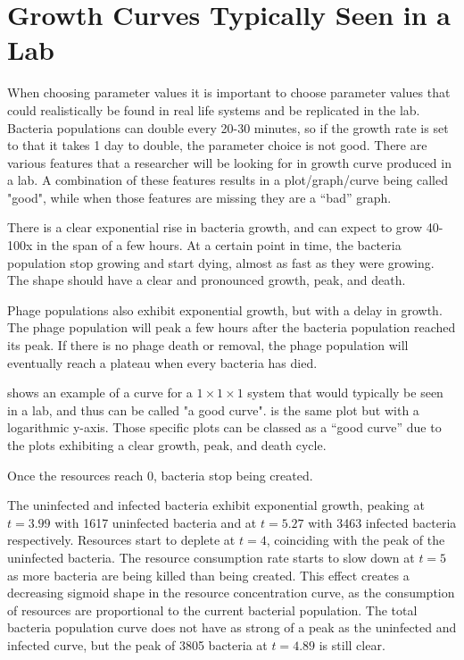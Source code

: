 \section{Growth Curves Typically Seen in a Lab}
\label{sec:literaturereview:growth_curves_typically_seen_in_a_lab}

When choosing parameter values it is important to choose parameter values that could realistically be found in real life systems and be replicated in the lab. 
Bacteria populations can double every 20-30 minutes, so if the growth rate is set to that it takes 1 day to double, the parameter choice is not good. 
There are various features that a researcher will be looking for in growth curve produced in a lab.
A combination of these features results in a plot/graph/curve being called "good", while when those features are missing they are a “bad” graph. 

There is a clear exponential rise in bacteria growth, and can expect to grow 40-100x in the span of a few hours. 
At a certain point in time, the bacteria population stop growing and start dying, almost as fast as they were growing. 
The shape should have a clear and pronounced growth, peak, and death. 

Phage populations also exhibit exponential growth, but with a delay in growth. 
The phage population will peak a few hours after the bacteria population reached its peak. 
If there is no phage death or removal, the phage population will eventually reach a plateau when every bacteria has died. 

 shows an example of a curve for a $1\times1\times1$ system that would typically be seen in a lab, and thus can be called "a good curve". 
 is the same plot but with a logarithmic y-axis. 
Those specific plots can be classed as a “good curve” due to the plots exhibiting a clear growth, peak, and death cycle. 

Once the resources reach 0, bacteria stop being created.

The uninfected and infected bacteria exhibit exponential growth, peaking at $t=3.99$ with 1617 uninfected bacteria and at $t=5.27$ with 3463 infected bacteria respectively. 
Resources start to deplete at $t=4$, coinciding with the peak of the uninfected bacteria. 
The resource consumption rate starts to slow down at $t=5$ as more bacteria are being killed than being created. 
This effect creates a decreasing sigmoid shape in the resource concentration curve, as the consumption of resources are proportional to the current bacterial population. 
The total bacteria population curve does not have as strong of a peak as the uninfected and infected curve, but the peak of 3805 bacteria at $t=4.89$ is still clear. 

